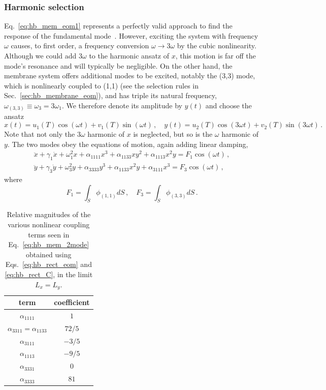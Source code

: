 \subsubsection{Harmonic selection}

Eq.~\eqref{eq:hb_mem_eom1} represents a perfectly valid approach to find the response of the fundamental mode~\cite{Steeneken_2021, Miller_2021}. However, exciting the system with frequency $\omega$ causes, to first order, a frequency conversion $\omega \rightarrow 3\omega$ by the cubic nonlinearity. Although we could add $3\omega $ to the harmonic ansatz of $x$, this motion is far off the mode's resonance and will typically be negligible. On the other hand, the membrane system offers additional modes to be excited, notably the (3,3) mode, which is nonlinearly coupled to (1,1) (see the selection rules in Sec.~\ref{sec:hb_membrane_eom}), and has triple its natural frequency, $\omega_{(3,3)} \equiv \omega_3 = 3 \omega_1$. We therefore denote its amplitude by $y(t)$ and choose the ansatz
\begin{equation} \label{eq:hb_1133_ansatz}
x(t) = u_1(T) \cos(\omega t) + v_1(T) \sin(\omega t) \,, \quad y(t) = u_2(T) \cos(3\omega t) + v_2(T) \sin(3\omega t) \,.
\end{equation}
Note that not only the $3\omega$ harmonic of $x$ is neglected, but so is the $\omega$ harmonic of $y$. The two modes obey the equations of motion, again adding linear damping,
\begin{equation} \label{eq:hb_mem_2mode}
\begin{gathered}
\ddot{x} + \gamma_1 \dot{x} + \omega_1^2 x + \alpha_{1111} x^3 + \alpha_{1133} x y^2 + \alpha_{1113} x^2 y = F_1 \cos(\omega t)\,, \\
\ddot{y} + \gamma_3 \dot{y} + \omega_3^2 y + \alpha_{3333} y^3 + \alpha_{1133} x^2 y + \alpha_{3111} x^3 = F_3 \cos(\omega t)\,,
\end{gathered} 
\end{equation}
where
\begin{equation}
F_1 = \int_S \phi_{(1,1)} dS\,, \quad F_3 = \int_S \phi_{(3,3)} dS \,.
\end{equation}
\begin{table}[ht] 
	\centering
	\caption{Relative magnitudes of the various nonlinear coupling terms seen in Eq.~\eqref{eq:hb_mem_2mode} obtained using Eqs.~\eqref{eq:hb_rect_eom} and \eqref{eq:hb_rect_C}, in the limit $L_x = L_y$.}
	\label{table:hb_rect_coeffs}
	\begin{tabular}{ |c|c| } 
		\hline
		term & coefficient \\ \hline
		$\alpha_{1111}$	& $1$ \\
		$\alpha_{3311} = \alpha_{1133}$ & $72/5$\\ 
		$\alpha_{3111}$ & $-3/5$ \\
		$\alpha_{1113}$ & $-9/5$ \\
		$\alpha_{3331}$ & $0$\\
		$\alpha_{3333}$ & $81$ \\ \hline
	\end{tabular}
\end{table}
